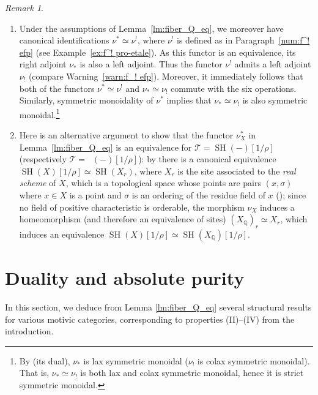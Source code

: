 \documentclass[JEP,XML,SOM,Unicode]{cedram}
\newcommand{\T}{\mathscr T}
\renewcommand{\AA}{\mathbb A}
\DeclareMathOperator{\SH}{SH}
\DeclareMathOperator{\DA}{D_{\AA^1}}
\newcommand{\QQ} {\mathbb Q}
\theoremstyle{remark}
\newtheorem{rem}[thm]{Remark}
\theoremstyle{definition}
\numberwithin{equation}{thm}
\begin{document}
\skpt
\begin{rem}\label{rem:nu^* six operations}
\begin{enumerate}
\item
Under the assumptions of Lemma~\ref{lm:fiber_Q_eq}, we moreover have canonical identifications $\nu^*\simeq\nu^!$, where $\nu^!$ is defined as in Paragraph~\ref{num:f^! efp} (see Example~\ref{ex:f^! pro-etale}).
As this functor is an equivalence, its right adjoint $\nu_*$ is also a left adjoint.
Thus the functor $\nu^!$ admits a left adjoint $\nu_!$ (compare Warning~\ref{warn:f_! efp}).
Moreover, it immediately follows that both of the functors $\nu^* \simeq \nu^!$ and $\nu_* \simeq \nu_!$ commute with the six operations.
Similarly, symmetric monoidality of $\nu^*$ implies that $\nu_*\simeq\nu_!$ is also symmetric monoidal.\footnote{By \cite[Prop.\,2.5.5.1]{LurieSAG} (\resp its dual), $\nu_*$ is lax symmetric monoidal (\resp $\nu_!$ is colax symmetric monoidal).
That is, $\nu_*\simeq\nu_!$ is both lax and colax symmetric monoidal, hence it is strict symmetric monoidal.}

\item
Here is an alternative argument to show that the functor $\nu_X^*$ in Lemma~\ref{lm:fiber_Q_eq} is an equivalence for $\T=\SH(-)[1/\rho]$ (respectively $\T=\DA(-)[1/\rho]$): by \cite[Th.\,35]{Bachmann} there is a canonical equivalence $\SH(X)[1/\rho]\simeq\SH(X_r)$, where $X_r$ is the site associated to the \emph{real scheme} of $X$, which is a topological space whose points are pairs $(x,\sigma)$ where $x\in X$ is a point and $\sigma$ is an ordering of the residue field of $x$ (\cite[0.4.1]{Scheiderer}); since no field of positive characteristic is orderable, the morphism $\nu_X$ induces a homeomorphism (and therefore an equivalence of sites) $(X_\QQ)_r\simeq X_r$, which induces an equivalence $\SH(X)[1/\rho]\simeq\SH(X_\QQ)[1/\rho]$.
\end{enumerate}
\end{rem}

\section{Duality and absolute purity}
\label{sec:abspur}

In this section, we deduce from Lemma \ref{lm:fiber_Q_eq} several structural results for various motivic categories, corresponding to properties (II)--(IV) from the introduction.
\end{document}
